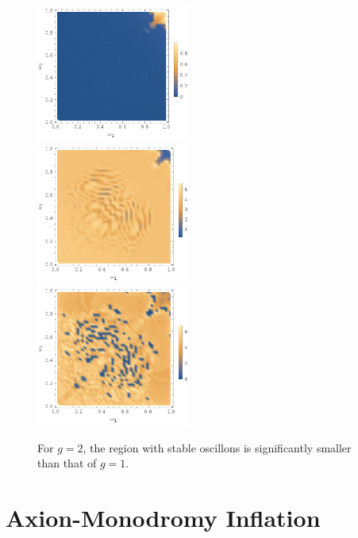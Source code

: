 \documentclass[11pt]{book}
\begin{document}
\begin{figure}
    \centering
    \includegraphics[width=0.45\textwidth]{plot/energy-ratio-phi6-1d-g_2.png}\\
    \includegraphics[width=0.45\textwidth]{plot/r_max-phi6-1d-g_2.png}\\
    \includegraphics[width=0.45\textwidth]{plot/slow-mode-logscale-phi6-1d-g_2.png}\\
    \caption{For $g=2$, the region with stable oscillons is significantly smaller than that of $g=1$.}\label{phi6g2}
\end{figure}

\chapter{Axion-Monodromy Inflation}\label{appcosmo}
\end{document}
